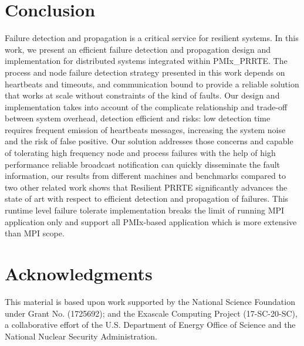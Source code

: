 \documentclass[sigconf]{acmart}
\begin{document}
\section{Conclusion}
Failure detection and propagation is a critical service for resilient systems. In this work, we present an efficient failure detection and propagation design and implementation for distributed systems integrated within PMIx\_PRRTE. The process and node failure detection strategy presented in this work depends on heartbeats and timeouts, and communication bound to provide a reliable solution that works at scale without constraints of the kind of faults. Our design and implementation takes into account of the complicate relationship and trade-off between system overhead, detection efficient and risks: low detection time requires frequent emission of heartbeats messages, increasing the system noise and the risk of false positive. Our solution addresses those concerns and capable of tolerating high frequency node and process failures with the help of high performance reliable broadcast notification can quickly disseminate the fault information, our results from different machines and benchmarks compared to two other related work shows that Resilient PRRTE significantly advances the state of art with respect to efficient detection and propagation of failures. This runtime level failure tolerate implementation breaks the limit of running MPI  application only and support all PMIx-based application which is more extensive than MPI scope.   


\section{Acknowledgments}
%
\begin{acks}
This material is based upon work supported by the National Science Foundation under Grant No. (1725692); and the Exascale Computing Project (17-SC-20-SC), a collaborative effort of the 
U.S. Department of Energy Office of Science and the National Nuclear Security Administration.    
\end{acks}

%


\end{document}
